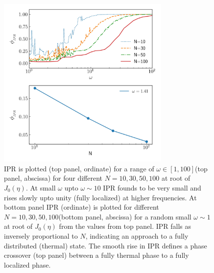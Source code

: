 \documentclass[%
reprint,
superscriptaddress,
linenumbers,
amsmath,amssymb,
aps,
prb,
showkeys,
]{revtex4-2}
\begin{document}
	\begin{figure}[!ht]
		\centering
		\includegraphics[width =8.5cm]{phase_crossover_LMG.jpeg}
		\caption{IPR is plotted (top panel, ordinate) for a range of $\omega \in[1,100]$(top panel, abscissa) for four different $N=10,30,50, 100$ at root of $J_0(\eta)$. At small $\omega$ upto $\omega \sim 10$ IPR founds to be very small and rises slowly upto unity (fully localized) at higher frequencies. At bottom panel IPR (ordinate) is plotted for different $N=10,30,50, 100$(bottom panel, abscissa) for a random small $\omega \sim 1$ at root of $J_0(\eta)$ from the values from top panel. IPR falls as inversely proportional to $N$, indicating an approach to a fully distributed (thermal) state. The smooth rise in IPR defines a phase crossover (top panel) between a fully thermal phase to a fully localized phase.}
		\label{fig:phase_transition}
	\end{figure}
\end{document}
